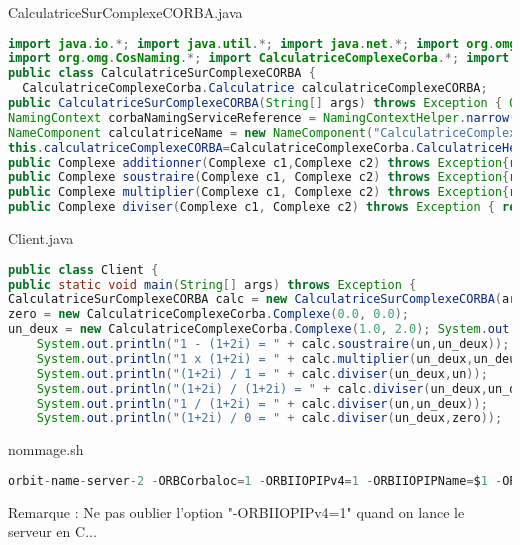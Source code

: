 \documentclass{article}
\begin{document}
\vspace{-1ex}
CalculatriceSurComplexeCORBA.java
\vspace{-1.5ex}
\begin{lstlisting}[language=JAVA]
import java.io.*; import java.util.*; import java.net.*; import org.omg.CORBA.*;
import org.omg.CosNaming.*; import CalculatriceComplexeCorba.*; import CalculatriceComplexeCorba.CalculatricePackage.*;
public class CalculatriceSurComplexeCORBA {
  CalculatriceComplexeCorba.Calculatrice calculatriceComplexeCORBA;
public CalculatriceSurComplexeCORBA(String[] args) throws Exception { ORB orb = ORB.init(args, null);
NamingContext corbaNamingServiceReference = NamingContextHelper.narrow(orb.resolve_initial_references("NameService"));
NameComponent calculatriceName = new NameComponent("CalculatriceComplexeCorba", ""); NameComponent calculatricePath[] = {calculatriceName};
this.calculatriceComplexeCORBA=CalculatriceComplexeCorba.CalculatriceHelper.narrow(   corbaNamingServiceReference.resolve(calculatricePath));}
public Complexe additionner(Complexe c1,Complexe c2) throws Exception{return calculatriceComplexeCORBA.additionner(c1, c2);}
public Complexe soustraire(Complexe c1, Complexe c2) throws Exception{return calculatriceComplexeCORBA.soustraire(c1, c2); }
public Complexe multiplier(Complexe c1, Complexe c2) throws Exception{return calculatriceComplexeCORBA.multiplier(c1, c2); }
public Complexe diviser(Complexe c1, Complexe c2) throws Exception { return calculatriceComplexeCORBA.diviser(c1, c2); } }
\end{lstlisting}


\vspace{-1ex}
Client.java
\vspace{-1.5ex}
\begin{lstlisting}[language=JAVA]
public class Client {
public static void main(String[] args) throws Exception {
CalculatriceSurComplexeCORBA calc = new CalculatriceSurComplexeCORBA(args[0].split(" ")); CalculatriceComplexeCorba.Complexe un = new CalculatriceComplexeCorba.Complexe(1.0, 0.0);
zero = new CalculatriceComplexeCorba.Complexe(0.0, 0.0);
un_deux = new CalculatriceComplexeCorba.Complexe(1.0, 2.0); System.out.println("1 + (1+2i) = " + calc.additionner(un,un_deux));
    System.out.println("1 - (1+2i) = " + calc.soustraire(un,un_deux));
    System.out.println("1 x (1+2i) = " + calc.multiplier(un_deux,un_deux));
    System.out.println("(1+2i) / 1 = " + calc.diviser(un_deux,un));
    System.out.println("(1+2i) / (1+2i) = " + calc.diviser(un_deux,un_deux));
    System.out.println("1 / (1+2i) = " + calc.diviser(un,un_deux));
    System.out.println("(1+2i) / 0 = " + calc.diviser(un_deux,zero));  } }
\end{lstlisting}


\vspace{-1ex}
nommage.sh
\vspace{-1.5ex}
\begin{lstlisting}[language=c]
orbit-name-server-2 -ORBCorbaloc=1 -ORBIIOPIPv4=1 -ORBIIOPIPName=$1 -ORBIIOPIPSock=$2 --key=NamingService
\end{lstlisting}

Remarque : Ne pas oublier l’option "-ORBIIOPIPv4=1" quand on lance le serveur en C...
\end{document}
